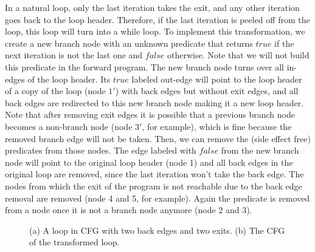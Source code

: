 \documentclass[12pt]{gatech-thesis}
\begin{document}
In a natural loop, only the last iteration takes the exit, and any other iteration goes back to the loop header.
Therefore, if the last iteration is peeled off from the loop, this loop will turn into a while loop. 
To implement this transformation, we create a new branch node with an unknown predicate that returns $true$ if the next iteration is not the last one and $false$ otherwise.
Note that we will not build this predicate in the forward program. 
The new branch node turns over all in-edges of the loop header. 
Its $true$ labeled out-edge will point to the loop header of a copy of the loop (node $1'$) with back edges but without exit edges, and all back edges are redirected to this new branch node making it a new loop header. 
Note that after removing exit edges it is possible that a previous branch node becomes a non-branch node (node $3'$, for example), which is fine because the removed branch edge will not be taken. Then, we can remove the (side effect free) predicates from those nodes. The edge labeled with $false$ from the new branch node will point to the original loop header (node 1) and all back edges in the original loop are removed, since the last iteration won't take the back edge. The nodes from which the exit of the program is not reachable due to the back edge removal are removed (node 4 and 5, for example). Again the predicate is removed from a node once it is not a branch node anymore (node 2 and 3).

\begin{figure}%
\caption{(a) A loop in CFG with two back edges and two exits. (b) The CFG of the transformed loop.}
\label{fig:loop}
\end{figure}
\end{document}
